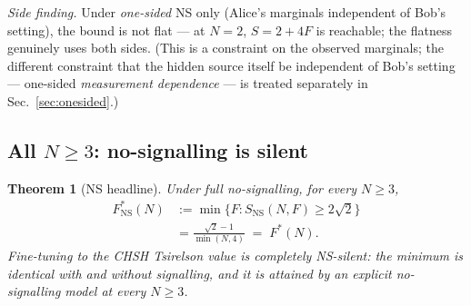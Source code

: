 \documentclass[aps,pra,reprint,superscriptaddress,floatfix]{revtex4-2}
\newtheorem{theorem}{Theorem}
\begin{document}
\noindent
\emph{Side finding.} Under \emph{one-sided} NS only (Alice's marginals
independent of Bob's setting), the bound is not flat --- at $N=2$,
$S=2+4F$ is reachable; the flatness genuinely uses both sides. (This is a
constraint on the observed marginals; the different constraint that the
hidden source itself be independent of Bob's setting --- one-sided
\emph{measurement dependence} --- is treated separately in
Sec.~\ref{sec:onesided}.)

\subsection{All $N\ge3$: no-signalling is silent}
\label{sec:ns3}

\begin{theorem}[NS headline]
\label{thm:ns}
Under full no-signalling, for every $N\ge3$,
\begin{equation}
\begin{aligned}
F^*_{\mathrm{NS}}(N) &:= \min\{F:S_{\mathrm{NS}}(N,F)\ge 2\sqrt{2}\}\\
&= \frac{\sqrt{2}-1}{\min(N,4)} \;=\; F^*(N).
\end{aligned}
\label{eq:FstarNS}
\end{equation}
Fine-tuning to the CHSH Tsirelson value is completely NS-silent: the minimum
is identical with and without signalling, and it is attained by an explicit
no-signalling model at every $N\ge3$.
\end{theorem}
\end{document}
